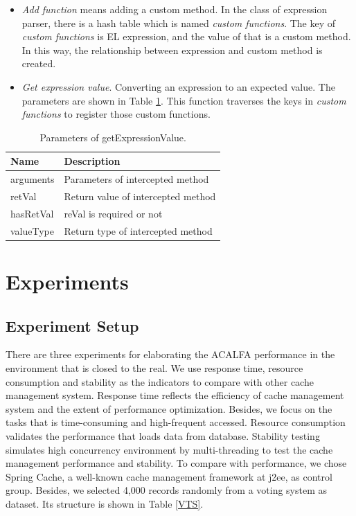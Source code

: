 \documentclass{singlecol-new}
\theoremstyle{TH}{
\newtheorem{lemma}{Lemma}
\newtheorem{theorem}[lemma]{Theorem}
\newtheorem{corrolary}[lemma]{Corrolary}
\newtheorem{conjecture}[lemma]{Conjecture}
\newtheorem{proposition}[lemma]{Proposition}
\newtheorem{claim}[lemma]{Claim}
\newtheorem{stheorem}[lemma]{Wrong Theorem}
}
\theoremstyle{THrm}{
\newtheorem{definition}{Definition}[section]
\newtheorem{question}{Question}[section]
\newtheorem{remark}{Remark}
\newtheorem{scheme}{Scheme}
}
\theoremstyle{THhit}{
\newtheorem{case}{Case}[section]
}
\begin{document}
\begin{itemize}
  \item \textit{Add function} means adding a custom method. In the class of expression parser, there is a hash table which is named \textit{custom functions}. The key of \textit{custom functions} is EL expression, and the value of that is a custom method. In this way, the relationship between expression and custom method is created.
  \item \textit{Get expression value}. Converting an expression to an expected value. The parameters are shown in Table \ref{getExpressionValue}. This function traverses the keys in \textit{custom functions} to register those custom functions.
\end{itemize}

\begin{table}[htb]
\begin{center}
 \caption{\label{getExpressionValue}Parameters of getExpressionValue.}
 \begin{tabular}{ll}
 \toprule
Name & Description\\
 \midrule
arguments & Parameters of intercepted method\\
retVal & Return value of intercepted method\\
hasRetVal & reVal is required or not\\
valueType & Return type of intercepted method\\
\bottomrule
 \end{tabular}
\end{center}
\end{table}

\section{Experiments}
\label{Experiments}

\subsection{Experiment Setup}
There are three experiments for elaborating the ACALFA performance in the environment that is closed to the real. We use response time, resource consumption and stability as the indicators to compare with other cache management system. Response time reflects the efficiency of cache management system and the extent of performance optimization. Besides, we focus on the tasks that is time-consuming and high-frequent accessed. Resource consumption validates the performance that loads data from database. Stability testing simulates high concurrency environment by multi-threading to test the cache management performance and stability. To compare with performance, we chose Spring Cache, a well-known cache management framework at j2ee, as control group. Besides, we selected 4,000 records randomly from a voting system as dataset. Its structure is shown in Table \ref{VTS}.
\end{document}

